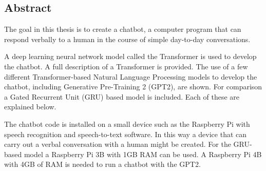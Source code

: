 
\begin{center}
	
\section*{Abstract}
\end{center}

	
The goal in this thesis is to create a chatbot, a computer program that can respond verbally to a human in the course of simple day-to-day conversations.

A deep learning neural network model called the Transformer is used to develop the chatbot. A full description of a Transformer is provided. The use of a few different Transformer-based Natural Language Processing models to develop the chatbot, including  Generative Pre-Training 2 (GPT2), are shown. For comparison a Gated Recurrent Unit (GRU) based model is included. Each of these are explained below.

The chatbot code is installed on a small device  such as the Raspberry Pi with speech recognition and speech-to-text software. In this way a device that can carry out a verbal conversation with a human  might be created. For the GRU-based model a Raspberry Pi 3B with 1GB RAM can be used. A Raspberry Pi 4B with 4GB of RAM is needed to run a chatbot with the GPT2. 

